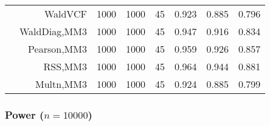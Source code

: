 \documentclass[
]{article}
\begin{document}
\begin{table}[H]
{\begin{tabular}[t]{lrrrrrrr}
\hspace{1em} & WaldVCF & 1000 & 1000 & 45 & 0.923 & 0.885 & 0.796\\

\hspace{1em} & WaldDiag,MM3 & 1000 & 1000 & 45 & 0.947 & 0.916 & 0.834\\

\hspace{1em} & Pearson,MM3 & 1000 & 1000 & 45 & 0.959 & 0.926 & 0.857\\

\hspace{1em} & RSS,MM3 & 1000 & 1000 & 45 & 0.964 & 0.944 & 0.881\\

\hspace{1em} & Multn,MM3 & 1000 & 1000 & 45 & 0.924 & 0.885 & 0.799\\
\bottomrule
\end{tabular}}
\endgroup{}
\end{table}

\hypertarget{power-n10000}{%
\subsubsection{\texorpdfstring{Power
(\(n=10000\))}{Power (n=10000)}}\label{power-n10000}}
\end{document}
